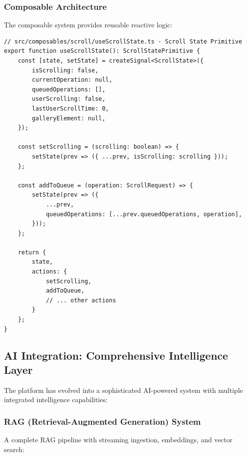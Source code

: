\documentclass[11pt]{article}
\begin{document}
\subsubsection{Composable Architecture}

The composable system provides reusable reactive logic:

\begin{lstlisting}[style=typescript]
// src/composables/scroll/useScrollState.ts - Scroll State Primitive
export function useScrollState(): ScrollStatePrimitive {
    const [state, setState] = createSignal<ScrollState>({
        isScrolling: false,
        currentOperation: null,
        queuedOperations: [],
        userScrolling: false,
        lastUserScrollTime: 0,
        galleryElement: null,
    });

    const setScrolling = (scrolling: boolean) => {
        setState(prev => ({ ...prev, isScrolling: scrolling }));
    };

    const addToQueue = (operation: ScrollRequest) => {
        setState(prev => ({
            ...prev,
            queuedOperations: [...prev.queuedOperations, operation],
        }));
    };

    return {
        state,
        actions: {
            setScrolling,
            addToQueue,
            // ... other actions
        }
    };
}
\end{lstlisting}

\subsection{AI Integration: Comprehensive Intelligence Layer}

The platform has evolved into a sophisticated AI-powered system with multiple integrated intelligence capabilities:

\subsubsection{RAG (Retrieval-Augmented Generation) System}

A complete RAG pipeline with streaming ingestion, embeddings, and vector search:
\end{document}

